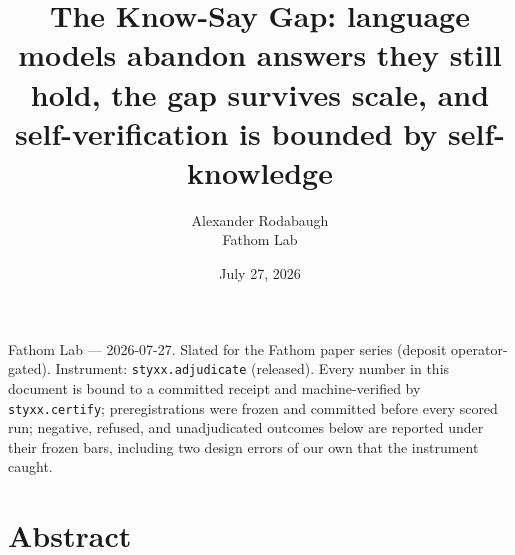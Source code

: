 \documentclass[11pt]{article}
\title{The Know-Say Gap: language models abandon answers they still hold, the gap survives scale, and self-verification is bounded by self-knowledge}
\author{Alexander Rodabaugh\\Fathom Lab}
\date{July 27, 2026}
\begin{document}
\maketitle
Fathom Lab --- 2026-07-27. Slated for the Fathom paper series (deposit operator-gated). Instrument: \texttt{styxx.adjudicate} (released). Every number in this document is bound to a committed receipt and machine-verified by \texttt{styxx.certify}; preregistrations were frozen and committed before every scored run; negative, refused, and unadjudicated outcomes below are reported under their frozen bars, including two design errors of our own that the instrument caught.

\section{Abstract}\label{abstract}
\end{document}
